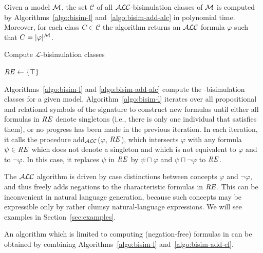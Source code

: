 \begin{theorem}\label{theo:bisimulation-classes}
Given a model $\mathcal{M}$, the set $\mathcal{C}$ of all $\mathcal{ALC}$-bisimulation classes
of $\mathcal{M}$ is computed by Algorithms~\ref{algo:bisim-l} and~\ref{algo:bisim-add-alc} in polynomial time.  Moreover, for each class $C \in \mathcal{C}$ the algorithm returns an $\mathcal{ALC}$ formula $\varphi$ such that
$C = |\varphi|^{\mathcal{M}}$.
\end{theorem}

\begin{algorithm}[t]
\dontprintsemicolon
\caption{Compute $\mathcal{L}$-bisimulation classes}
\label{algo:bisim-l}

$\mathit{RE} \leftarrow \{\top\}$


\end{algorithm}

Algorithms~\ref{algo:bisim-l} and \ref{algo:bisim-add-alc} compute
the \alc-bi\-sim\-u\-la\-tion classes for a given model.
Algorithm~\ref{algo:bisim-l} iterates over all propositional and
relational symbols of the signature to construct new formulas until
either all formulas in $\mathit{RE}$ denote singletons (i.e., there is only one
individual that satisfies them), or no progress has been made in the
previous iteration.  In each iteration, it calls the procedure
add$_\mathcal{ALC}$($\varphi$, $\mathit{RE}$), which intersects $\varphi$ with any formula $\psi
\in \mathit{RE}$ which does not denote a singleton and which is
not equivalent to $\varphi$ and to $\neg \varphi$. In this case, it
replaces $\psi$ in $\mathit{RE}$ by $\psi \sqcap \varphi$ and $\psi \sqcap \neg \varphi$ to
$\mathit{RE}$.

The $\mathcal{ALC}$ algorithm is driven by case distinctions between
concepts $\varphi$ and $\neg \varphi$, and thus freely adds 
negations to the characteristic formulas in $\mathit{RE}$.  This can be inconvenient
in natural language generation, because such concepts may be expressible only by rather clumsy natural-language expressions. We will see examples in Section~\ref{sec:examples}.

An algorithm which is limited to computing
(negation-free) formulas in \el can be obtained by combining
Algorithms~\ref{algo:bisim-l} and~\ref{algo:bisim-add-el}.

